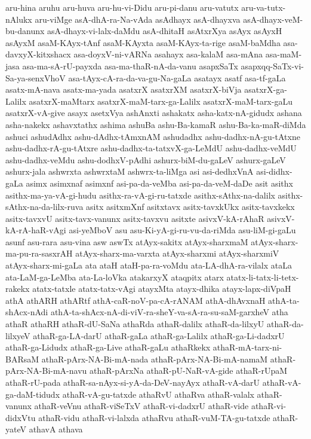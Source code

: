 {aru-hina
aruhu
aru-huva
aru-hu-vi-Didu
aru-pi-danu
aru-vatutx
aru-va-tutx-nAlukx
aru-viMge
asA-dhA-ra-Na-vAda
asAdhayx
asA-dhayxva
asA-dhayx-veM-bu-danunx
asA-dhayx-vi-lalx-daMdu
asA-dhitaH
asAtxrXya
asAyx
asAyxH
asAyxM
asaM-KAyx-tAnf
asaM-KAyxta
asaM-KAyx-ta-rige
asaM-baMdha
asa-davxyX-kitxshacx
asa-doyxV-ni-vARNa
asahayx
asa-kalaM
asa-mAna
asa-maM-jasa
asa-ma-sA-rU-payxda
asa-ma-thaR-nA-da-vanu
asapxSaTx
asapxqq-SaTx-vi-Sa-ya-senxVhoV
asa-tAyx-cA-ra-da-va-gu-Na-gaLa
asatayx
asatf
asa-tf-gaLa
asatx-mA-nava
asatx-ma-yada
asatxrX
asatxrXM
asatxrX-biVja
asatxrX-ga-Lalilx
asatxrX-maMtarx
asatxrX-maM-tarx-ga-Lalilx
asatxrX-maM-tarx-gaLu
asatxrX-vA-give
asayx
asetxVya
ashAnxti
ashakatx
asha-katx-nA-gidudx
ashana
asha-nakekx
ashavxtathx
ashima
ashuBa
ashu-Ba-kamaR
ashu-Ba-ka-maR-diMda
ashuci
ashudAdhx
ashu-dAdhx-tAmxnAM
ashudadhx
ashu-dadhx-nA-gu-tAtxne
ashu-dadhx-rA-gu-tAtxre
ashu-dadhx-ta-tatxvX-ga-LeMdU
ashu-dadhx-veMdU
ashu-dadhx-veMdu
ashu-dodhxV-pAdhi
ashurx-biM-du-gaLeV
ashurx-gaLeV
ashurx-jala
ashwrxta
ashwrxtaM
ashwrx-ta-liMga
asi
asi-dedhxVnA
asi-didhx-gaLa
asimx
asimxnaf
asimxnf
asi-pa-da-veMba
asi-pa-da-veM-daDe
asit
asithx
asithx-ma-ya-vA-gi-hudu
asithx-ra-vA-gi-ru-tatxde
asithx-sAthx-na-dalilx
asithx-sAthx-na-da-lilx-ruva
asitx
asitxmXnf
asitxtavx
asitx-tavxkUkx
asitx-tavxkekx
asitx-tavxvU
asitx-tavx-vanunx
asitx-tavxvu
asitxte
asivxV-kA-rAhaR
asivxV-kA-rA-haR-vAgi
asi-yeMboV
asu
asu-Ki-yA-gi-ru-vu-da-riMda
asu-liM-gi-gaLu
asunf
asu-rara
asu-vina
asw
aswTx
atAyx-sakitx
atAyx-sharxmaM
atAyx-sharx-ma-pu-ra-sasxrAH
atAyx-sharx-ma-varxta
atAyx-sharxmi
atAyx-sharxmiV
atAyx-sharx-mi-gaLa
ata
ataH
ataH-pa-ra-voMdu
ata-LA-dhA-ra-vilalx
ataLa
ata-LaM-ga-LeMba
ata-La-loVka
atakarxyX
ataqpitx
atarx
atatx-li-tatx-li-tetx-rakekx
atatx-tatxle
atatx-tatx-vAgi
atayxMta
atayx-dhika
atayx-lapx-diVpaH
athA
athARH
athARtf
athA-caR-noV-pa-cA-rANAM
athA-dhAvxnaH
athA-ta-shAcx-nAdi
athA-ta-shAcx-nA-di-viV-ra-sheY-va-sA-ra-su-saM-garxheV
atha
athaR
athaRH
athaR-dU-SaNa
athaRda
athaR-dalilx
athaR-da-lilxyU
athaR-da-lilxyeV
athaR-ga-LA-darU
athaR-gaLa
athaR-ga-Lalilx
athaR-ga-Li-dadxrU
athaR-ga-Lidudx
athaR-ga-Live
athaR-gaLu
athaRkekx
athaR-mA-tarx-ni-BARsaM
athaR-pArx-NA-Bi-mA-nada
athaR-pArx-NA-Bi-mA-namaM
athaR-pArx-NA-Bi-mA-navu
athaR-pArxNa
athaR-pU-NaR-vA-gide
athaR-rUpaM
athaR-rU-pada
athaR-sa-nAyx-si-yA-da-DeV-nayAyx
athaR-vA-darU
athaR-vA-ga-daM-tidudx
athaR-vA-gu-tatxde
athaRvU
athaRva
athaR-valalx
athaR-vanunx
athaR-veVnu
athaR-viSeTxV
athaR-vi-dadxrU
athaR-vide
athaR-vi-didxVtu
athaR-vidu
athaR-vi-lalxda
athaRvu
athaR-vuM-TA-gu-tatxde
athaR-yateV
athavA
athava
}
